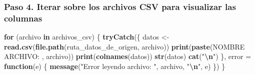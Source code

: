 \documentclass[
]{article}
\newenvironment{Shaded}{\begin{snugshade}}{\end{snugshade}}
\newcommand{\AttributeTok}[1]{\textcolor[rgb]{0.13,0.29,0.53}{#1}}
\newcommand{\ControlFlowTok}[1]{\textcolor[rgb]{0.13,0.29,0.53}{\textbf{#1}}}
\newcommand{\FunctionTok}[1]{\textcolor[rgb]{0.13,0.29,0.53}{\textbf{#1}}}
\newcommand{\NormalTok}[1]{#1}
\newcommand{\OtherTok}[1]{\textcolor[rgb]{0.56,0.35,0.01}{#1}}
\newcommand{\SpecialCharTok}[1]{\textcolor[rgb]{0.81,0.36,0.00}{\textbf{#1}}}
\newcommand{\StringTok}[1]{\textcolor[rgb]{0.31,0.60,0.02}{#1}}
\begin{document}
\subsubsection{\texorpdfstring{\textbf{Paso 4.} Iterar sobre los
archivos CSV para visualizar las
columnas}{Paso 4. Iterar sobre los archivos CSV para visualizar las columnas}}\label{paso-4.-iterar-sobre-los-archivos-csv-para-visualizar-las-columnas}

\begin{Shaded}
\begin{Highlighting}[]
\ControlFlowTok{for}\NormalTok{ (archivo }\ControlFlowTok{in}\NormalTok{ archivos\_csv) \{ }
  \FunctionTok{tryCatch}\NormalTok{(\{}
\NormalTok{    datos }\OtherTok{\textless{}{-}} \FunctionTok{read.csv}\NormalTok{(}\FunctionTok{file.path}\NormalTok{(ruta\_datos\_de\_origen, archivo)) }
    \FunctionTok{print}\NormalTok{(}\FunctionTok{paste}\NormalTok{(}\StringTok{\textquotesingle{}NOMBRE ARCHIVO: \textquotesingle{}}\NormalTok{, archivo))}
    \FunctionTok{print}\NormalTok{(}\FunctionTok{colnames}\NormalTok{(datos))}
    \FunctionTok{str}\NormalTok{(datos)}
    \FunctionTok{cat}\NormalTok{(}\StringTok{"}\SpecialCharTok{\textbackslash{}n}\StringTok{"}\NormalTok{)}
\NormalTok{  \}, }\AttributeTok{error =} \ControlFlowTok{function}\NormalTok{(e) \{}
    \FunctionTok{message}\NormalTok{(}\StringTok{"Error leyendo archivo: "}\NormalTok{, archivo, }\StringTok{"}\SpecialCharTok{\textbackslash{}n}\StringTok{"}\NormalTok{, e)}
\NormalTok{  \})}
\NormalTok{\}}
\end{Highlighting}
\end{Shaded}
\end{document}
